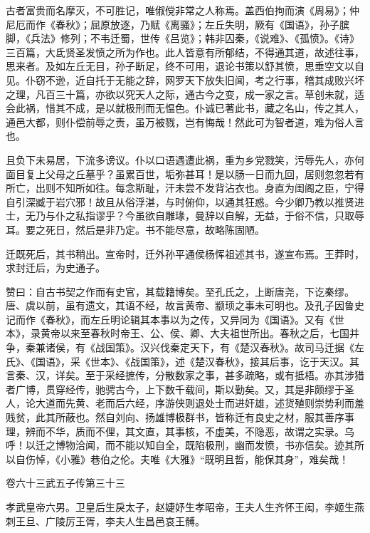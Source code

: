 \documentclass[12pt,UTF8]{ctexbook}
\begin{document}
古者富贵而名摩灭，不可胜记，唯俶傥非常之人称焉。盖西伯拘而演《周易》；仲尼厄而作《春秋》；屈原放逐，乃赋《离骚》；左丘失明，厥有《国语》，孙子膑脚，《兵法》修列；不韦迁蜀，世传《吕览》；韩非囚秦，《说难》、《孤愤》。《诗》三百篇，大氐贤圣发愤之所为作也。此人皆意有所郁结，不得通其道，故述往事，思来者。及如左丘无目，孙子断足，终不可用，退论书策以舒其愤，思垂空文以自见。仆窃不逊，近自托于无能之辞，网罗天下放失旧闻，考之行事，稽其成败兴坏之理，凡百三十篇，亦欲以究天人之际，通古今之变，成一家之言。草创未就，适会此祸，惜其不成，是以就极刑而无愠色。仆诚已著此书，藏之名山，传之其人，通邑大都，则仆偿前辱之责，虽万被戮，岂有悔哉！然此可为智者道，难为俗人言也。



且负下未易居，下流多谤议。仆以口语遇遭此祸，重为乡党戮笑，污辱先人，亦何面目复上父母之丘墓乎？虽累百世，垢弥甚耳！是以肠一日而九回，居则忽忽若有所亡，出则不知所如往。每念斯耻，汗未尝不发背沾衣也。身直为闺阁之臣，宁得自引深臧于岩穴邪！故且从俗浮湛，与时俯仰，以通其狂惑。今少卿乃教以推贤进士，无乃与仆之私指谬乎？今虽欲自雕瑑，曼辞以自解，无益，于俗不信，只取辱耳。要之死日，然后是非乃定。书不能尽意，故略陈固陋。



迁既死后，其书稍出。宣帝时，迁外孙平通侯杨恽祖述其书，遂宣布焉。王莽时，求封迁后，为史通子。



赞曰：自古书契之作而有史官，其载籍博矣。至孔氏之，上断唐尧，下讫秦缪。唐、虞以前，虽有遗文，其语不经，故言黄帝、颛顼之事未可明也。及孔子因鲁史记而作《春秋》，而左丘明论辑其本事以为之传，又异同为《国语》。又有《世本》，录黄帝以来至春秋时帝王、公、侯、卿、大夫祖世所出。春秋之后，七国并争，秦兼诸侯，有《战国策》。汉兴伐秦定天下，有《楚汉春秋》。故司马迁据《左氏》、《国语》，采《世本》、《战国策》，述《楚汉春秋》，接其后事，讫于天汉。其言秦、汉，详矣。至于采经摭传，分散数家之事，甚多疏略，或有抵梧。亦其涉猎者广博，贯穿经传，驰骋古今，上下数千载间，斯以勤矣。又，其是非颇缪于圣人，论大道而先黄、老而后六经，序游侠则退处士而进奸雄，述货殖则崇势利而羞贱贫，此其所蔽也。然自刘向、扬雄博极群书，皆称迁有良史之材，服其善序事理，辨而不华，质而不俚，其文直，其事核，不虚美，不隐恶，故谓之实录。乌呼！以迁之博物洽闻，而不能以知自全，既陷极刑，幽而发愤，书亦信矣。迹其所以自伤悼，《小雅》巷伯之伦。夫唯《大雅》“既明且哲，能保其身”，难矣哉！





卷六十三武五子传第三十三



孝武皇帝六男。卫皇后生戾太子，赵婕妤生孝昭帝，王夫人生齐怀王闳，李姬生燕刺王旦、广陵厉王胥，李夫人生昌邑哀王髆。
\end{document}
